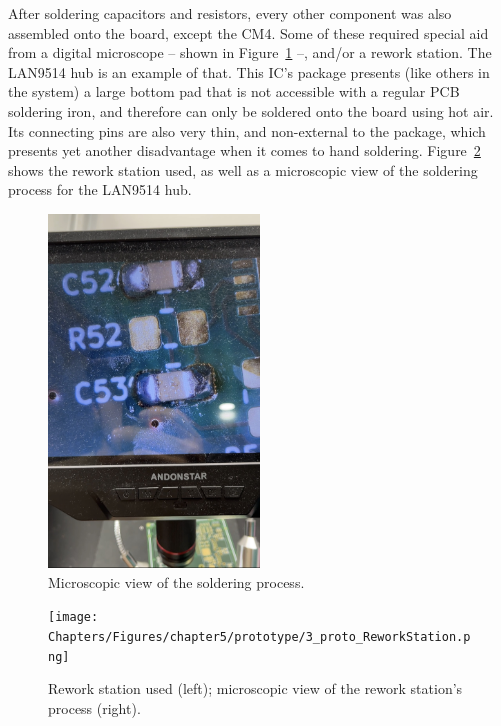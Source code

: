 After soldering capacitors and resistors, every other component was also assembled onto the board, except the CM4. Some of these required special aid from a digital microscope -- shown in Figure~\ref{fig:3_proto_Microscope_Capacitors} --, and/or a rework station. The LAN9514 hub is an example of that. This IC's package presents (like others in the system) a large bottom pad that is not accessible with a regular PCB soldering iron, and therefore can only be soldered onto the board using hot air. Its connecting pins are also very thin, and non-external to the package, which presents yet another disadvantage when it comes to hand soldering. Figure~\ref{fig:3_proto_ReworkStation} shows the rework station used, as well as a microscopic view of the soldering process for the LAN9514 hub.

\begin{figure}[h]
	\centering
	\includegraphics[width=0.5\textwidth]{Chapters/Figures/chapter5/prototype/3_proto_Microscope_Capacitors.png}
	\caption{Microscopic view of the soldering process.}
	\label{fig:3_proto_Microscope_Capacitors}
\end{figure}%

\begin{figure}[h]
	\centering
	\texttt{[image: Chapters/Figures/chapter5/prototype/3\_proto\_ReworkStation.png]}
	\caption{Rework station used (left); microscopic view of the rework station's process (right).}
	\label{fig:3_proto_ReworkStation}
\end{figure}%

